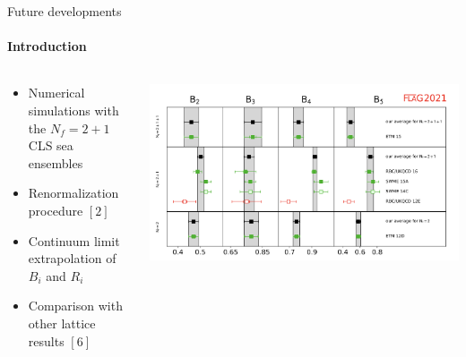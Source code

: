 \documentclass{beamer}
\begin{document}
\begin{frame}{Future developments}
      \framesubtitle{Introduction}
      \begin{columns}
            \begin{column}{0.4\textwidth}
                  \begin{itemize}
                        \item Numerical simulations with the $N_f = 2+1$ CLS sea ensembles
                        \item Renormalization procedure $[2]$
                        \item Continuum limit extrapolation of $B_i$ and $R_i$
                        \item Comparison with other lattice results $[6]$
                  \end{itemize}
            \end{column}
            \begin{column}{0.65\textwidth}
                  \includegraphics[width=\textwidth]{assets/Bi3GeV-falg2021.png}
            \end{column}
      \end{columns}
\end{frame}
\end{document}
